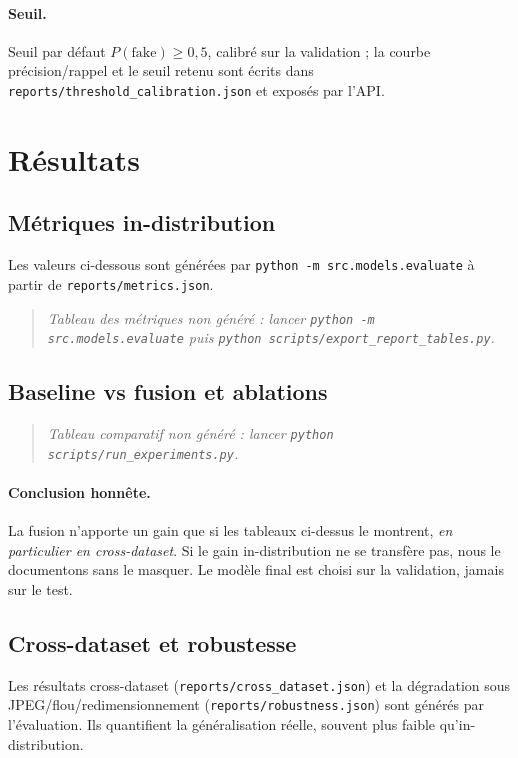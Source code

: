 \documentclass[11pt,a4paper]{article}
\begin{document}
\paragraph{Seuil.} Seuil par défaut $P(\text{fake}) \ge 0{,}5$, calibré sur la
validation ; la courbe précision/rappel et le seuil retenu sont écrits dans
\texttt{reports/threshold\_calibration.json} et exposés par l'API.

\section{Résultats}
\subsection{Métriques in-distribution}
Les valeurs ci-dessous sont générées par
\texttt{python -m src.models.evaluate} à partir de \texttt{reports/metrics.json}.

  {}
  {\begin{quote}\itshape Tableau des métriques non généré : lancer
   \texttt{python -m src.models.evaluate} puis
   \texttt{python scripts/export\_report\_tables.py}.\end{quote}}

\subsection{Baseline vs fusion et ablations}
  {}
  {\begin{quote}\itshape Tableau comparatif non généré : lancer
   \texttt{python scripts/run\_experiments.py}.\end{quote}}

\paragraph{Conclusion honnête.} La fusion n'apporte un gain que si les tableaux
ci-dessus le montrent, \emph{en particulier en cross-dataset}. Si le gain
in-distribution ne se transfère pas, nous le documentons sans le masquer. Le
modèle final est choisi sur la validation, jamais sur le test.

\subsection{Cross-dataset et robustesse}
Les résultats cross-dataset (\texttt{reports/cross\_dataset.json}) et la
dégradation sous JPEG/flou/redimensionnement (\texttt{reports/robustness.json})
sont générés par l'évaluation. Ils quantifient la généralisation réelle, souvent
plus faible qu'in-distribution.
\end{document}

